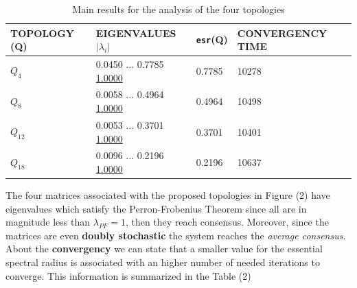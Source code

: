 \begin{table}[h]\label{table:2}
    \centering
    \begin{tabular}{| p{3.5cm} | p{5.5cm} |p{2cm} |p{5cm} | }
        \hline
        \textbf{TOPOLOGY (Q)}&\textbf{EIGENVALUES $\vert \lambda_i \vert$}&\textbf{\texttt{esr}(Q)}&\textbf{CONVERGENCY TIME}\\
        \hline
        {\Large  $Q_4$}&{\small
            0.0450 ...
    0.7785
    \underline{1.0000}
        }&      {0.7785}&       { 10278}\\
        \hline
        {\Large  $Q_8$}&{\small
            0.0058 ...
    0.4964
    \underline{1.0000}
        }&    { 0.4964}&{ 10498}\\
        \hline
        {\Large $Q_{12}$}&{\small
            0.0053 ...
    0.3701
    \underline{1.0000}
        }&  { 0.3701}&{  10401}\\
        \hline
        {\Large  $Q_{18}$}&{\small
            0.0096 ...
        0.2196
        \underline{1.0000}}&   { 0.2196}&{10637}\\
        \hline
    \end{tabular}
    \caption{Main results for the analysis of the four topologies}
\end{table}

\noindent
The four matrices associated with the proposed topologies in Figure (2) have eigenvalues which satisfy the Perron-Frobenius Theorem since all are in magnitude less than $\lambda_{PF}=1$, then they reach consensus. Moreover, since the matrices are even \textbf{doubly stochastic} the system reaches the \textit{average consensus}.
About the \textbf{convergency} we can state that a smaller value for the essential spectral radius is associated with an higher number of needed iterations to converge. This information is summarized in the Table (2) 

